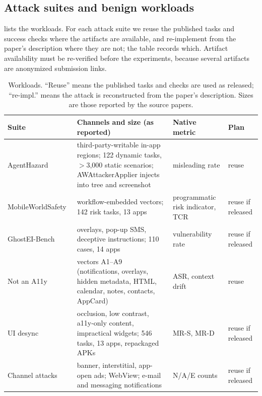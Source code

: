 \subsection{Attack suites and benign workloads}\label{sec:workloads}

 lists the workloads. For each attack suite we reuse the published tasks and success checks where the artifacts are available, and re-implement from the paper's description where they are not; the table records which. Artifact availability must be re-verified before the experiments, because several artifacts are anonymized submission links.

\begin{table}[t]
\centering
\caption{Workloads. ``Reuse'' means the published tasks and checks are used as released; ``re-impl.'' means the attack is reconstructed from the paper's description. Sizes are those reported by the source papers.}
\label{tab:suites}
\footnotesize
\setlength{\tabcolsep}{3pt}
\begin{tabularx}{\textwidth}{@{}>{\raggedright\arraybackslash}p{3.1cm} >{\raggedright\arraybackslash}X >{\raggedright\arraybackslash}p{2.3cm} >{\raggedright\arraybackslash}p{1.7cm}@{}}
\toprule
Suite & Channels and size (as reported) & Native metric & Plan \\
\midrule
AgentHazard~\cite{liu2026agenthazard} & third-party-writable in-app regions; 122 dynamic tasks, $>$3{,}000 static scenarios; AWAttackerApplier injects into tree and screenshot & misleading rate & reuse \\
MobileWorld\-Safety~\cite{chen2026mobileworldsafety} & 5 workflow-embedded vectors; 142 risk tasks, 13 apps & programmatic risk indicator, TCR & reuse if released \\
GhostEI-Bench~\cite{chen2025ghosteibench} & overlays, pop-up SMS, deceptive instructions; 110 cases, 14 apps & vulnerability rate & reuse if released \\
Not an A11y~\cite{deivasigamani2026nota11y} & vectors A1--A9 (notifications, overlays, hidden metadata, HTML, calendar, notes, contacts, AppCard) & ASR, context drift & reuse \\
UI desync~\cite{li2026uidesync} & occlusion, low contrast, a11y-only content, impractical widgets; 546 tasks, 13 apps, repackaged APKs & MR-S, MR-D & reuse if released \\
Channel attacks~\cite{du2025measuringmobileagents} & banner, interstitial, app-open ads; WebView; e-mail and messaging notifications & N/A/E counts & reuse if released \\

\end{tabularx}
\end{table}

